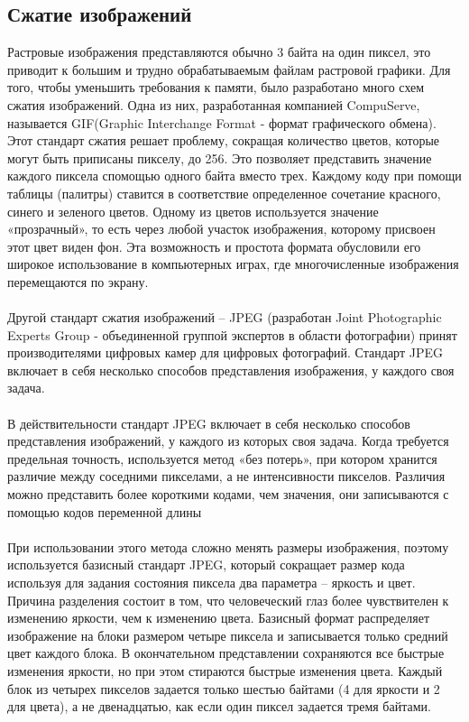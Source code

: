\subsection{Сжатие изображений}
Растровые изображения представляются обычно 3 байта на один пиксел, это приводит к большим и трудно обрабатываемым файлам растровой графики. Для того, чтобы уменьшить требования к памяти, было разработано много схем сжатия изображений. Одна из них, разработанная компанией CompuServe, называется GIF(Graphic Interchange Format - формат графического обмена). Этот стандарт сжатия решает проблему, сокращая количество цветов, которые могут быть приписаны пикселу, до 256. Это позволяет представить значение каждого пиксела спомощью одного байта вместо трех. Каждому коду при помощи таблицы (палитры) ставится в соответствие определенное сочетание красного, синего и зеленого цветов. Одному из цветов используется значение «прозрачный», то есть через любой участок изображения, которому присвоен этот цвет виден фон. Эта возможность и простота формата обусловили его широкое использование в компьютерных играх, где многочисленные изображения перемещаются по экрану.\\
\\Другой стандарт сжатия изображений -- JPEG (разработан Joint Photographic Experts Group - объединенной группой экспертов в области фотографии) принят производителями цифровых камер для цифровых фотографий. Стандарт JPEG включает в себя несколько способов представления изображения, у каждого своя задача.\\
\\В действительности стандарт JPEG включает в себя несколько способов представления изображений, у каждого из которых своя задача. Когда требуется предельная точность, используется метод «без потерь», при котором хранится различие между соседними пикселами, а не интенсивности пикселов.  Различия можно представить более короткими кодами, чем значения, они записываются с помощью кодов переменной длины\\
\\При использовании этого метода сложно менять размеры изображения, поэтому используется базисный стандарт JPEG, который сокращает размер кода используя для задания состояния пиксела два параметра – яркость и цвет. Причина разделения состоит в том, что человеческий глаз более чувствителен к изменению яркости, чем к изменению цвета. Базисный формат распределяет изображение на блоки размером четыре пиксела и записывается только средний цвет каждого блока. В окончательном представлении сохраняются все быстрые изменения яркости, но при этом стираются быстрые изменения цвета. Каждый блок из четырех пикселов задается только шестью байтами (4 для яркости и 2 для цвета), а не двенадцатью, как если один пиксел задается тремя байтами.\\
